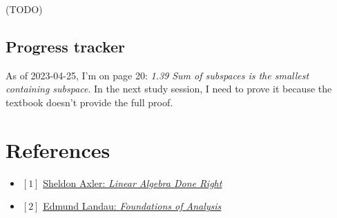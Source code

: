 \documentclass[12pt, letterpaper, oneside]{book}
\begin{document}
(TODO)

\section{Progress tracker}

As of 2023-04-25, I'm on page 20: \textit{1.39 Sum of subspaces is the smallest
containing subspace}. In the next study session, I need to prove it because the
textbook doesn't provide the full proof.

\chapter*{References}

\begin{itemize}
  \item $[1]$ \href{https://linear.axler.net/}{Sheldon Axler: \it{Linear Algebra Done Right}}
  \item $[2]$ \href{https://bookstore.ams.org/view?ProductCode=CHEL/79}{Edmund Landau: \it{Foundations of Analysis}}
\end{itemize}
\end{document}
